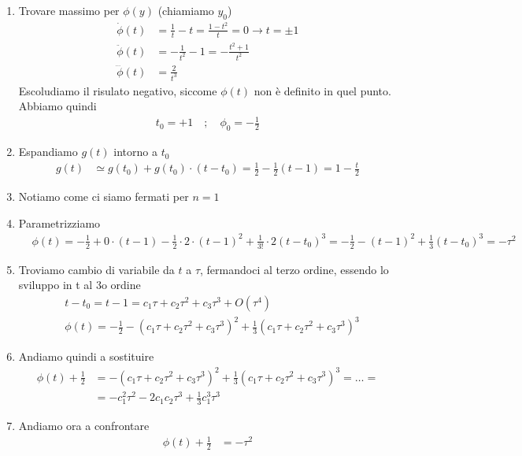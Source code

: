 \begin{enumerate}
	\item Trovare massimo per \(\phi(y)\) (chiamiamo \(y_0\))
	\begin{align}
		\dot{\phi}(t) &=\frac{1}{t} - t = \frac{1- t^2}{t} = 0 \to t = \pm 1\\
		\ddot{\phi}(t) &= -\frac{1}{t^2} - 1 = -\frac{t^2+1}{t^2}  \\
		\dddot{\phi}(t) &= \frac{2}{t^3}
	\end{align}
	Escoludiamo il risulato negativo, siccome $\phi(t)$ non è definito in quel punto. Abbiamo quindi
	\begin{align}
		t_0=+1 \quad ; \quad\phi_0 = -\frac{1}{2}
	\end{align}
	\item Espandiamo \(g(t)\) intorno a \(t_0\)
	\begin{align}
		g(t) &\simeq g(t_0) + g(t_0)\cdot(t-t_0) = \frac{1}{2} - \frac{1}{2} (t-1) = 1-\frac{t}{2} 
	\end{align}
	\item Notiamo come ci siamo fermati per \(n=1\)
	\item Parametrizziamo
	\begin{align}
		&\phi(t)= -\frac{1}{2} + 0\cdot(t-1) - \frac{1}{2}\cdot 2 \cdot(t-1)^2  + \frac{1}{3!} \cdot 2 (t-t_0)^3= -\frac{1}{2} - (t-1)^2 + \frac{1}{3} (t-t_0)^3= -\tau^2
	\end{align}
	\item Troviamo cambio di variabile da \(t\) a \(\tau\), fermandoci al terzo ordine, essendo lo sviluppo in t al 3o ordine
	\begin{align}
		&t-t_0 = t-1 = c_1 \tau + c_2 \tau^2 + c_3 \tau^3 + O(\tau^4)\\
		&\phi(t) = - \frac{1}{2} - (c_1 \tau + c_2 \tau^2 + c_3 \tau^3)^2+ \frac{1}{3} (c_1 \tau + c_2 \tau^2 + c_3 \tau^3)^3
	\end{align}
	\item Andiamo quindi a sostituire
	\begin{align}
		\phi(t) + \frac{1}{2} &=  - (c_1 \tau + c_2 \tau^2 + c_3 \tau^3)^2+ \frac{1}{3} (c_1 \tau + c_2 \tau^2 + c_3 \tau^3)^3 = \dots = \nonumber\\
		&= -c_1^2 \tau^2 - 2c_1c_2 \tau^3 + \frac{1}{3}c_1^3 \tau^3
	\end{align}
	\item Andiamo ora a confrontare
	\begin{align}
		\phi(t) + \frac{1}{2} &= -\tau^2\\

\end{align}
\end{enumerate}
